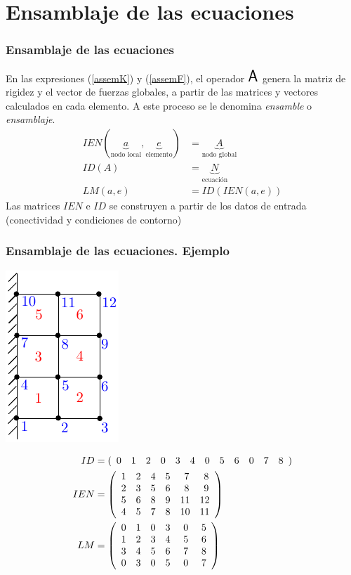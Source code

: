 \documentclass[handout]{beamer}
\begin{document}
\section{Ensamblaje de las ecuaciones}
\begin{frame}
\frametitle{Ensamblaje de las ecuaciones}
En las expresiones (\ref{assemK}) y (\ref{assemF}), el operador
${\mbox{\LARGE{\bf {\sf A}}}}$
genera la matriz de rigidez y el vector de fuerzas globales, a partir de
las matrices y vectores calculados en cada elemento. A este proceso se le
denomina {\em ensamble} o {\em ensamblaje}.
\begin{align*}
IEN(\underbrace{a}_{\textrm{nodo local}},\underbrace{e}_{\textrm{elemento}})&=
\underbrace{A}_{\textrm{nodo global}} \\
ID(A)&=\underbrace{N}_{\textrm{ecuación}} \\
LM(a,e)&=ID(IEN(a,e))
\end{align*}
Las matrices $IEN$ e $ID$ se construyen a partir de los datos de
entrada (conectividad y condiciones de contorno)
\end{frame}
\begin{frame}
\frametitle{Ensamblaje de las ecuaciones. Ejemplo}
\parbox{0.20\textwidth}{
\includegraphics{ensam}
} \hfill
\parbox{0.30\textwidth}{ \begin{footnotesize}
\begin{align*}
ID&=(
\begin{array}{cccccccccccc}
$0$ & $1$ & $2$ & $0$ & $3$ & $4$ & $0$ & $5$ & $6$ & $0$ & $7$ & $8$
\end{array}
) \\
IEN&=\left(
\begin{array}{cccccc}
$1$ & $2$ & $4$ & $5$ & $ 7$ & $ 8$ \\
$2$ & $3$ & $5$ & $6$ & $ 8$ & $ 9$ \\
$5$ & $6$ & $8$ & $9$ & $11$ & $12$ \\
$4$ & $5$ & $7$ & $8$ & $10$ & $11$
\end{array}
\right) \\
LM&=\left(
\begin{array}{cccccc}
$0$ & $1$ & $0$ & $3$ & $ 0$ & $ 5$ \\
$1$ & $2$ & $3$ & $4$ & $ 5$ & $ 6$ \\
$3$ & $4$ & $5$ & $6$ & $ 7$ & $ 8$ \\
$0$ & $3$ & $0$ & $5$ & $ 0$ & $ 7$
\end{array}
\right)
\end{align*}
\end{footnotesize}}
\end{frame}
\end{document}
